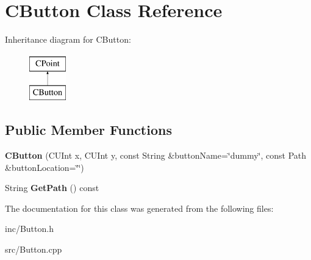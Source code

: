 \hypertarget{classCButton}{\section{C\-Button Class Reference}
\label{classCButton}
}
Inheritance diagram for C\-Button\-:\begin{figure}[H]
\begin{center}
\leavevmode
\includegraphics[height=2.000000cm]{classCButton}
\end{center}
\end{figure}
\subsection*{Public Member Functions}
\begin{DoxyCompactItemize}
\item 
\hypertarget{classCButton_a9c8a3e8bd97e29a94897ecb334f8d271}{{\bfseries C\-Button} (C\-U\-Int x, C\-U\-Int y, const String \&button\-Name=\char`\"{}dummy\char`\"{}, const Path \&button\-Location=\char`\"{}\char`\"{})}\label{classCButton_a9c8a3e8bd97e29a94897ecb334f8d271}

\item 
\hypertarget{classCButton_adfb3b62e942861d79cab77bce379de8f}{String {\bfseries Get\-Path} () const }\label{classCButton_adfb3b62e942861d79cab77bce379de8f}

\end{DoxyCompactItemize}


The documentation for this class was generated from the following files\-:\begin{DoxyCompactItemize}
\item 
inc/Button.\-h\item 
src/Button.\-cpp\end{DoxyCompactItemize}
